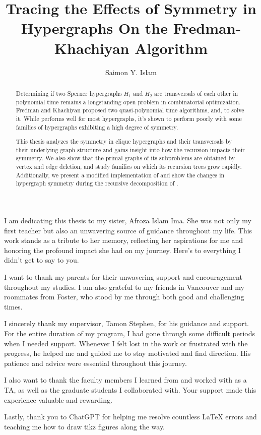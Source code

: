 \documentclass{sfuthesis}
\title{Tracing the Effects of Symmetry in Hypergraphs On the Fredman-Khachiyan Algorithm}
\author{Saimon Y. Islam}
\begin{document}
\frontmatter
\maketitle{}
\makecommittee{}

\begin{abstract}
Determining if two Sperner hypergraphs $H_1$ and $H_2$ are transversals of each other in polynomial time remains a longstanding open problem in combinatorial optimization. Fredman and Khachiyan proposed two quasi-polynomial time algorithms, \FKA{} and\FKB, to solve it. While \FKA{} performs well for most hypergraphs, it's shown to perform poorly with some families of hypergraphs exhibiting a high degree of symmetry.

This thesis analyzes the symmetry in clique hypergraphs and their transversals by their underlying graph structure and gains insight into how the \FKA{} recursion impacts their symmetry. We also show that the primal graphs of its subproblems are obtained by vertex and edge deletion, and study families on which its recursion trees grow rapidly. Additionally, we present a modified implementation of \FKA{} and show the changes in hypergraph symmetry during the recursive decomposition of \FKA.
\end{abstract}

\begin{dedication}
I am dedicating this thesis to my sister, Afroza Islam Ima. She was not only my first teacher but also an unwavering source of guidance throughout my life. This work stands as a tribute to her memory, reflecting her aspirations for me and honoring the profound impact she had on my journey. Here's to everything I didn't get to say to you.
\end{dedication}

\begin{acknowledgements}
I want to thank my parents for their unwavering support and encouragement throughout my studies. I am also grateful to my friends in Vancouver and my roommates from Foster, who stood by me through both good and challenging times.

I sincerely thank my supervisor, Tamon Stephen, for his guidance and support. For the entire duration of my program, I had gone through some difficult periods when I needed support. Whenever I felt lost in the work or frustrated with the progress, he helped me and guided me to stay motivated and find direction. His patience and advice were essential throughout this journey.

I also want to thank the faculty members I learned from and worked with as a TA, as well as the graduate students I collaborated with. Your support made this experience valuable and rewarding.

Lastly, thank you to ChatGPT for helping me resolve countless \LaTeX{} errors and teaching me how to draw tikz figures along the way.
\end{acknowledgements}
\end{document}
